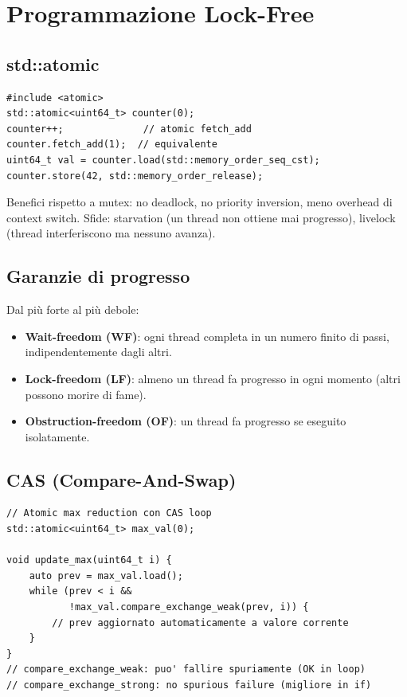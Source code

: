 \documentclass[11pt,a4paper]{article}
\theoremstyle{remark}
\begin{document}
\section{Programmazione Lock-Free}

\subsection{std::atomic}

\begin{lstlisting}
#include <atomic>
std::atomic<uint64_t> counter(0);
counter++;              // atomic fetch_add
counter.fetch_add(1);  // equivalente
uint64_t val = counter.load(std::memory_order_seq_cst);
counter.store(42, std::memory_order_release);
\end{lstlisting}

Benefici rispetto a mutex: no deadlock, no priority inversion, meno overhead di context switch.
Sfide: starvation (un thread non ottiene mai progresso), livelock (thread interferiscono ma nessuno avanza).

\subsection{Garanzie di progresso}

Dal più forte al più debole:
\begin{itemize}
  \item \textbf{Wait-freedom (WF)}: ogni thread completa in un numero finito di passi, indipendentemente dagli altri.
  \item \textbf{Lock-freedom (LF)}: almeno un thread fa progresso in ogni momento (altri possono morire di fame).
  \item \textbf{Obstruction-freedom (OF)}: un thread fa progresso se eseguito isolatamente.
\end{itemize}

\subsection{CAS (Compare-And-Swap)}

\begin{lstlisting}
// Atomic max reduction con CAS loop
std::atomic<uint64_t> max_val(0);

void update_max(uint64_t i) {
    auto prev = max_val.load();
    while (prev < i &&
           !max_val.compare_exchange_weak(prev, i)) {
        // prev aggiornato automaticamente a valore corrente
    }
}
// compare_exchange_weak: puo' fallire spuriamente (OK in loop)
// compare_exchange_strong: no spurious failure (migliore in if)
\end{lstlisting}
\end{document}
